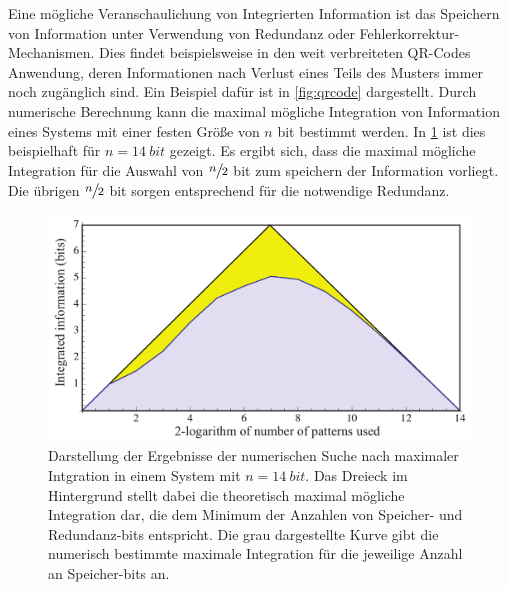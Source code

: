 Eine mögliche Veranschaulichung von Integrierten Information ist das Speichern von Information
unter Verwendung von Redundanz oder Fehlerkorrektur-Mechanismen. Dies findet beispielsweise in 
den weit verbreiteten QR-Codes Anwendung, deren Informationen nach Verlust eines Teils des Musters immer
noch zugänglich sind. Ein Beispiel dafür ist in \cref{fig:qrcode} dargestellt.
Durch numerische Berechnung kann die maximal mögliche Integration von Information eines Systems mit einer
festen Größe  von $n$ bit bestimmt werden. In  \cref{fig:maximal_integrated_information} ist dies beispielhaft 
für $n = \SI{14}{bit}$ gezeigt. Es ergibt sich, dass die maximal mögliche Integration für die Auswahl von 
{$\large \sfrac{n}{2}$} bit  zum speichern der Information vorliegt. Die übrigen {$\large \sfrac{n}{2}$} bit sorgen 
entsprechend für die notwendige Redundanz.

 
\begin{figure}%
	\centering
	\includegraphics[scale=0.2]{graphics/integrated_information_graph.jpg}
	\caption{Darstellung der Ergebnisse der numerischen Suche nach maximaler Intgration in einem System 
		mit $n = \SI{14}{bit}$. Das Dreieck im Hintergrund stellt dabei die theoretisch maximal mögliche 
		Integration dar, die dem Minimum der Anzahlen von Speicher- und Redundanz-bits entspricht. Die grau dargestellte
		Kurve gibt die numerisch bestimmte maximale Integration für die jeweilige Anzahl an Speicher-bits an. \label{fig:maximal_integrated_information}}
\end{figure}  

